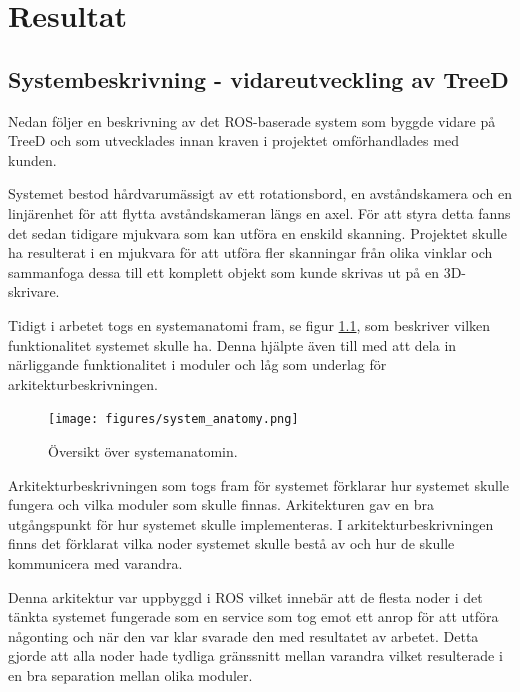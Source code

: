 \chapter{Resultat}
\label{cha:results}

\section{Systembeskrivning - vidareutveckling av TreeD}
\label{cha:results-systembeskrivning-treed}

Nedan följer en beskrivning av det ROS-baserade system som byggde vidare på TreeD och som utvecklades innan kraven i projektet omförhandlades med kunden.

Systemet bestod hårdvarumässigt av ett rotationsbord, en avståndskamera och en linjärenhet för att flytta avståndskameran längs en axel. För att styra detta fanns det sedan tidigare mjukvara som kan utföra en enskild skanning. Projektet skulle ha resulterat i en mjukvara för att utföra fler skanningar från olika vinklar och sammanfoga dessa till ett komplett objekt som kunde skrivas ut på en 3D-skrivare.

Tidigt i arbetet togs en systemanatomi fram, se figur \ref{fig:system_anatomy}, som beskriver vilken funktionalitet systemet skulle ha. Denna hjälpte även till med att dela in närliggande funktionalitet i moduler och låg som underlag för arkitekturbeskrivningen.

\begin{figure}[H]
	\centering{\tiny }
	\texttt{[image: figures/system\_anatomy.png]}
	\caption{Översikt över systemanatomin.}
	\label{fig:system_anatomy}
\end{figure}

Arkitekturbeskrivningen som togs fram för systemet förklarar hur systemet skulle fungera och vilka moduler som skulle finnas. Arkitekturen gav en bra utgångspunkt för hur systemet skulle implementeras. I arkitekturbeskrivningen finns det förklarat vilka noder systemet skulle bestå av och hur de skulle kommunicera med varandra.

Denna arkitektur var uppbyggd i ROS vilket innebär att de flesta noder i det tänkta systemet fungerade som en service som tog emot ett anrop för att utföra någonting och när den var klar svarade den med resultatet av arbetet. Detta gjorde att alla noder hade tydliga gränssnitt mellan varandra vilket resulterade i en bra separation mellan olika moduler.

